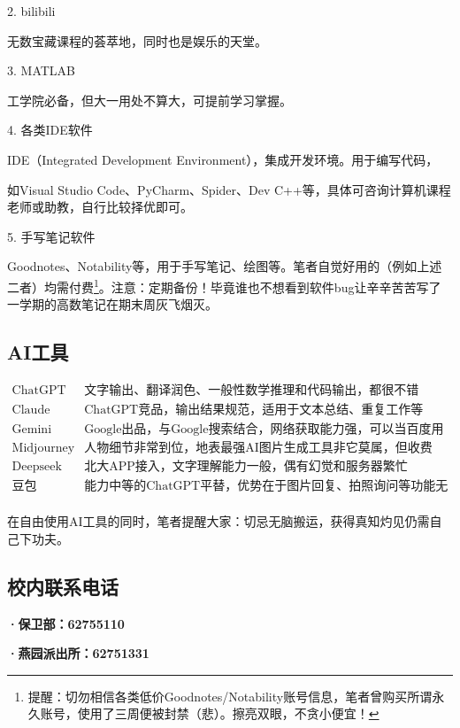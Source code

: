 \documentclass[11pt,oneside]{book}
\begin{document}
2. bilibili

无数宝藏课程的荟萃地，同时也是娱乐的天堂。

3. MATLAB

工学院必备，但大一用处不算大，可提前学习掌握。

4. 各类IDE软件

IDE（Integrated Development Environment），集成开发环境。用于编写代码，

如Visual Studio Code、PyCharm、Spider、Dev C++等，具体可咨询计算机课程老师或助教，自行比较择优即可。

5. 手写笔记软件

Goodnotes、Notability等，用于手写笔记、绘图等。笔者自觉好用的（例如上述二者）均需付费\footnote{提醒：切勿相信各类低价Goodnotes/Notability账号信息，笔者曾购买所谓永久账号，使用了三周便被封禁（悲）。擦亮双眼，不贪小便宜！}。注意：定期备份！毕竟谁也不想看到软件bug让辛辛苦苦写了一学期的高数笔记在期末周灰飞烟灭。

\subsection{AI工具}

\[
\begin{matrix}
    \text{ChatGPT} & \text{文字输出、翻译润色、一般性数学推理和代码输出，都很不错}\\
    \text{Claude} & \text{ChatGPT竞品，输出结果规范，适用于文本总结、重复工作等}\\
    \text{Gemini} & \text{Google出品，与Google搜索结合，网络获取能力强，可以当百度用}\\
    \text{Midjourney} & \text{人物细节非常到位，地表最强AI图片生成工具非它莫属，但收费（悲）}\\
    \text{Deepseek} & \text{北大APP接入，文字理解能力一般，偶有幻觉和服务器繁忙}\\
    \text{豆包} & \text{能力中等的ChatGPT平替，优势在于图片回复、拍照询问等功能无限制}\\
\end{matrix}
\]

在自由使用AI工具的同时，笔者提醒大家：切忌无脑搬运，获得真知灼见仍需自己下功夫。

\subsection{校内联系电话}

\textbf{·保卫部：62755110}

\textbf{·燕园派出所：62751331}
\end{document}
